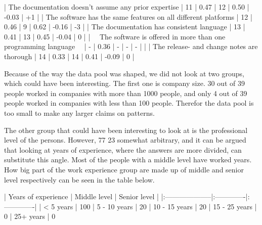 \documentclass[11pt]{article}
\begin{document}
\begin{multicols}{2}
{    | The documentation doesn't assume any prior expertise                  |                       11 | 0.47                      |                       12 | 0.50                       |       -0.03 |        +1 |
    | The software has the same features on all different platforms         |                       12 | 0.46                      |                        9 | 0.62                       |       -0.16 |        -3 |
    | The documentation has consistent language                             |                       13 | 0.41                      |                       13 | 0.45                       |       -0.04 |         0 |
    | ~~The software is offered in more than one programming language~~     |                        - | 0.36                      |                        - | -                          |           - |           |
    | The release- and change notes are thorough                            |                       14 | 0.33                      |                       14 | 0.41                       |       -0.09 |         0 |



    Because of the way the data pool was shaped, we did not look at two
    groups, which could have been interesting. The first one is company
    size. 30 out of 39 people worked in companies with more than 1000
    people, and only 4 out of 39 people worked in companies with less than
    100 people. Therefor the data pool is too small to make any larger
    claims on patterns.

    The other group that could have been interesting to look at is the
    professional level of the persons. However, 77%
    23%
    somewhat arbitrary, and it can be argued that looking at years of
    experience, where the answers are more divided, can substitute this
    angle. Most of the people with a middle level have worked  years.
    How big part of the work experience group are made up of middle and
    senior level respectively can be seen in the table below.

    | Years of experience | Middle level | Senior level |
    |:--------------------|:-------------|:-------------|
    | < 5 years           | 100%
    | 5 - 10 years        | 20%
    | 10 - 15 years       | 20%
    | 15 - 25 years       | 0%
    | 25+ years           | 0%

}
\end{multicols}
\end{document}
